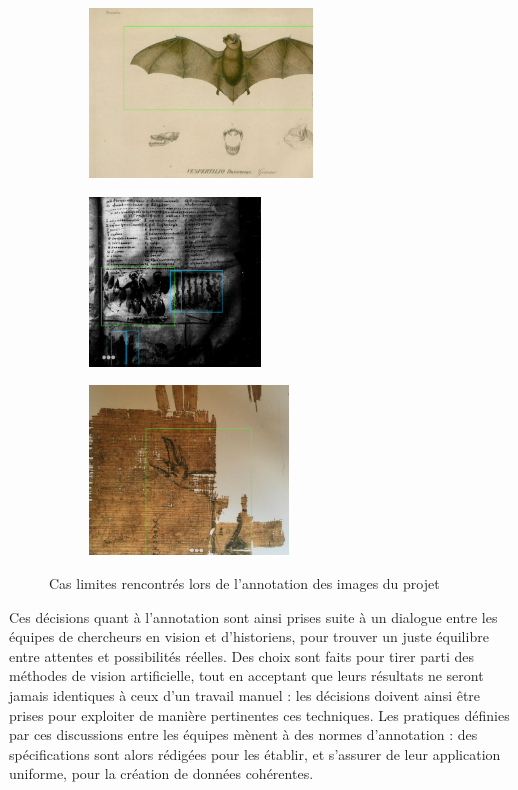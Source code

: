 	\begin{figure}[h]
	\begin{subfigure}{0.37\linewidth}
		\centering
		\includegraphics[height=4.5cm]{images/vhs_edge_case1.png}
	\end{subfigure}
	\hspace{1pt}
	\begin{subfigure}{0.30\linewidth}
		\centering
		\includegraphics[height=4.5cm]{images/vhs_edge_case2.png}
	\end{subfigure}
	\hspace{1pt}
	\begin{subfigure}{0.25\linewidth}
		\centering
		\includegraphics[height=4.5cm]{images/vhs_edge_case3.png}
	\end{subfigure}
	\caption{Cas limites rencontrés lors de l'annotation des images du projet \vhs}
	\label{fig:edge_cases_vhs}
\end{figure}

Ces décisions quant à l'annotation sont ainsi prises suite à un dialogue entre les équipes de chercheurs en vision et d'historiens, pour trouver un juste équilibre entre attentes et possibilités réelles. Des choix sont faits pour tirer parti des méthodes de vision artificielle, tout en acceptant que leurs résultats ne seront jamais identiques à ceux d'un travail manuel : les décisions doivent ainsi être prises pour exploiter de manière pertinentes ces techniques. Les pratiques définies par ces discussions entre les équipes mènent à des normes d'annotation : des spécifications sont alors rédigées pour les établir, et s'assurer de leur application uniforme, pour la création de données cohérentes.

